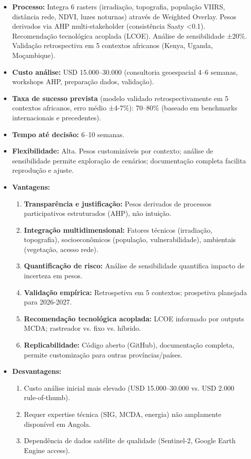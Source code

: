 \documentclass[12pt, a4paper]{article}
\begin{document}
\begin{itemize}
\item \textbf{Processo:} Integra 6 rasters (irradiação, topografia, população VIIRS, distância rede, NDVI, luzes noturnas) através de Weighted Overlay. Pesos derivados via AHP multi-stakeholder (consistência Saaty <0.1). Recomendação tecnológica acoplada (LCOE). Análise de sensibilidade ±20\%. Validação retrospectiva em 5 contextos africanos (Kenya, Uganda, Moçambique).

\item \textbf{Custo análise:} USD 15.000--30.000 (consultoria geoespacial 4--6 semanas, workshops AHP, preparação dados, validação).

\item \textbf{Taxa de sucesso prevista} (modelo validado retrospectivamente em 5 contextos africanos, erro médio ±4-7\%): 70--80\% (baseado em benchmarks internacionais e precedentes).

\item \textbf{Tempo até decisão:} 6--10 semanas.

\item \textbf{Flexibilidade:} Alta. Pesos customizáveis por contexto; análise de sensibilidade permite exploração de cenários; documentação completa facilita reprodução e ajuste.

\item \textbf{Vantagens:} 
  \begin{enumerate}
    \item \textbf{Transparência e justificação:} Pesos derivados de processos participativos estruturados (AHP), não intuição.
    \item \textbf{Integração multidimensional:} Fatores técnicos (irradiação, topografia), socioeconômicos (população, vulnerabilidade), ambientais (vegetação, acesso rede).
    \item \textbf{Quantificação de risco:} Análise de sensibilidade quantifica impacto de incerteza em pesos.
    \item \textbf{Validação empírica:} Retrospetiva em 5 contextos; prospetiva planejada para 2026-2027.
    \item \textbf{Recomendação tecnológica acoplada:} LCOE informado por outputs MCDA; rastreador vs. fixo vs. híbrido.
    \item \textbf{Replicabilidade:} Código aberto (GitHub), documentação completa, permite customização para outras províncias/países.
  \end{enumerate}

\item \textbf{Desvantagens:} 
  \begin{enumerate}
    \item Custo análise inicial mais elevado (USD 15.000--30.000 vs. USD 2.000 rule-of-thumb).
    \item Requer expertise técnica (SIG, MCDA, energia) não amplamente disponível em Angola.
    \item Dependência de dados satélite de qualidade (Sentinel-2, Google Earth Engine access).
  \end{enumerate}
\end{itemize}
\end{document}
